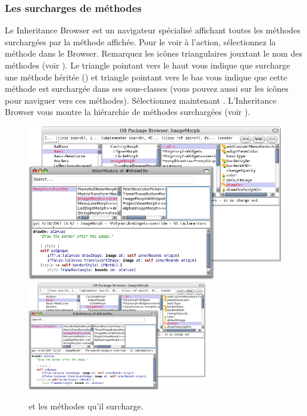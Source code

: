 \documentclass[a4paper,10pt,twoside]{book}
\begin{document}
\subsubsection{Les surcharges de méthodes}

Le Inheritance Browser est un navigateur spécialisé
affichant toutes les méthodes surchargées par la méthode affichée.
Pour le voir à l'action, sélectionnez la méthode
 dans le Browser.
Remarquez les icônes triangulaires jouxtant le nom des méthodes (voir ).
Le triangle pointant vers le haut vous indique que 
 surcharge une méthode héritée
 (\ie {}) et triangle pointant vers le bas vous
 indique que cette méthode est surchargée dans ses sous-classes (vous
 pouvez aussi \click sur les icônes pour naviguer vers ces méthodes).
Sélectionnez maintenant .
L'Inheritance Browser vous montre la hiérarchie de méthodes
surchargées (voir ).

\begin{figure}[tbp]
	\begin{center}
   \ifluluelse
		{\includegraphics[width=\textwidth]{OBInheritanceOverriding}}
		{\includegraphics[width=0.7\textwidth]{OBInheritanceOverriding}}
	\end{center}
	\caption{ et les méthodes qu'il
      surcharge. } %
\end{figure}
\end{document}
